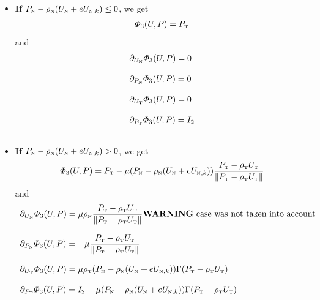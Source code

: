 \begin{itemize}
\begin{itemize}
\item  \textbf{If} $P_{\n} - \rho_{\n} (U_{\n} +e  U_{\n,k}) \leq 0$, we get
  \begin{equation}
  \label{eq:AC-TT5}
  \begin{array}{l}
  \varPhi_3(U,P) =   P_{\t}
\end{array}
\end{equation}
and
 \begin{equation}
   \label{eq:AC-TT6}
   \begin{array}{l}
     \partial_{U_{\n}} \varPhi_3(U,P) =  0 \\ \\
     \partial_{P_{\n}} \varPhi_3(U,P) =  0 \\ \\
     \partial_{U_{\t}} \varPhi_3(U,P) =  0 \\ \\
     \partial_{P_{\t}} \varPhi_3(U,P) =  I_2 \\ \\
   \end{array}
 \end{equation}
\item  \textbf{If} $P_{\n} - \rho_{\n} (U_{\n} +e  U_{\n,k}) > 0$, we get
\begin{equation}
  \label{eq:AC-TT7}
  \begin{array}{l}
  \varPhi_3(U,P) =  P_{\t} - \mu (P_{\n} - \rho_{\n} (U_{\n} +e  U_{\n,k}) )  \Frac{P_{\t} - \rho_{\t} U_{\t} }{ \| P_{\t} - \rho_{\t} U_{\t}\| }
\end{array}
\end{equation}
and
 \begin{equation}
   \label{eq:AC-TT8}
   \begin{array}{l}
     \partial_{U_{\n}} \varPhi_3(U,P) =  \mu \rho_{\n}  \Frac{P_{\t} - \rho_{\t} U_{\t} }{ \| P_{\t} - \rho_{\t} U_{\t}\| }\text{{\bf WARNING} case was not taken into account}\\ \\
     \partial_{P_{\n}} \varPhi_3(U,P) =  -\mu  \Frac{P_{\t} - \rho_{\t} U_{\t} }{ \| P_{\t} - \rho_{\t} U_{\t}\| } \\ \\
     \partial_{U_{\t}} \varPhi_3(U,P) =  \mu\rho_{\t}(P_{\n} - \rho_{\n} (U_{\n} +e  U_{\n,k}) ) \Gamma(P_{\t} - \rho_{\t} U_{\t})  \\ \\
     \partial_{P_{\t}} \varPhi_3(U,P) =  I_2-\mu(P_{\n} - \rho_{\n} (U_{\n} +e  U_{\n,k}) ) \Gamma(P_{\t} - \rho_{\t} U_{\t})  \\ \\
   \end{array}
 \end{equation}
\end{itemize}



\end{itemize}

